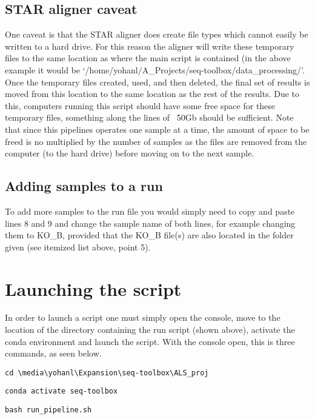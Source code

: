\subsection{STAR aligner caveat}
One caveat is that the STAR aligner does create file types which cannot easily be written to a hard drive. For this reason the aligner will write these temporary files to the same location as where the main script is contained (in the above example it would be `/home/yohanl/A\_Projects/seq-toolbox/data\_processing/'. Once the temporary files created, used, and then deleted, the final set of results is moved from this location to the same location as the rest of the results. Due to this, computers running this script should have some free space for these temporary files, something along the lines of ~50Gb should be sufficient. Note that since this pipelines operates one sample at a time, the amount of space to be freed is no multiplied by the number of samples as the files are removed from the computer (to the hard drive) before moving on to the next sample.

\subsection{Adding samples to a run \label{subsec:adding elements}}
To add more samples to the run file you would simply need to copy and paste lines 8 and 9 and change the sample name of both lines, for example changing them to KO\_B, provided that the KO\_B file(s) are also located in the folder given (see itemized list above, point 5).

\section{Launching the script \label{sec:RNAseq_launch}}
In order to launch a script one must simply open the console, move to the location of the directory containing the run script (shown above), activate the conda environment and launch the script. With the console open, this is three commands, as seen below.
\begin{lstlisting}
cd \media\yohanl\Expansion\seq-toolbox\ALS_proj
\end{lstlisting}
\begin{lstlisting}
conda activate seq-toolbox
\end{lstlisting}
\begin{lstlisting}
bash run_pipeline.sh
\end{lstlisting}

